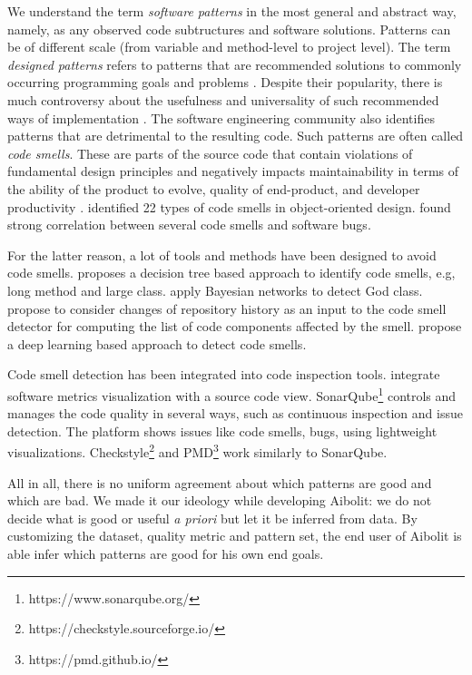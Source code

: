 We understand the term \textit{software patterns} in the most general and
abstract way, namely, as any observed code subtructures and software solutions.
Patterns can be of different scale (from variable and method-level to project
level). The term \textit{designed patterns} refers to patterns that are
recommended solutions to commonly occurring programming goals and problems
\citep{gamma1995design}. Despite their popularity, there is much controversy about the
usefulness and universality of such recommended ways of implementation
\citep{mcconnell2004code}. The software engineering community
also identifies patterns that are detrimental to the resulting code. Such
patterns are often called \textit{code smells}. These are parts of the
source code that contain violations of  fundamental design principles
and negatively impacts maintainability in terms of the
ability of the product to evolve, quality  of end-product, and developer
productivity \citet{Reeshti2019MeasuringCS}. \citet{Din2012AntipatternsDA}
identified 22 types of  code smells in object-oriented
design. \citet{Kessentini2019UnderstandingTC} found strong correlation  between
several code smells and software bugs.

For the latter reason, a lot of tools and methods have been designed to avoid
code smells. \citet{Kreimer2005AdaptiveDO}  proposes a decision tree based
approach to identify code smells, e.g, long method  and large class.
\citet{Vaucher2009TrackingDS} apply Bayesian  networks to detect God class.
\citet{Palomba2015MiningVH} propose  to consider changes of repository history
as an input to the code smell detector  for computing the list of code
components affected by the smell. \citet{Liu2019DeepLB} propose a deep learning
based approach  to detect code smells.

Code smell detection has been integrated into code inspection tools.
\citet{MurphyHill2010AnIA} integrate software metrics  visualization with a
source code view.  SonarQube\footnote{https://www.sonarqube.org/} controls and
manages  the code quality in several ways, such as continuous  inspection and
issue detection. The platform shows issues  like code smells, bugs, using
lightweight  visualizations.
Checkstyle\footnote{https://checkstyle.sourceforge.io/} and
PMD\footnote{https://pmd.github.io/}  work similarly to SonarQube.


All in all, there is no uniform agreement about which patterns are good and
which are bad. We made it our ideology while developing Aibolit: we do not
decide what is good or useful \textit{a priori} but let it be inferred from
data. By customizing the dataset, quality metric and pattern set, the end user
of Aibolit is able infer which patterns are good for his own end goals.

